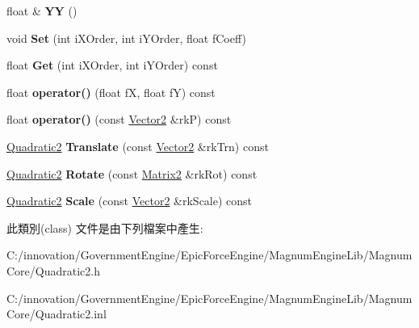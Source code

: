 \begin{DoxyCompactItemize}
\item 
float \& {\bfseries YY} ()\hypertarget{class_i_dream_sky_1_1_quadratic2_a40bb10511d8f31e854f7789db37356cf}{}\label{class_i_dream_sky_1_1_quadratic2_a40bb10511d8f31e854f7789db37356cf}

\item 
void {\bfseries Set} (int i\+X\+Order, int i\+Y\+Order, float f\+Coeff)\hypertarget{class_i_dream_sky_1_1_quadratic2_a2f5622be8b2299445e1d39a7514ee28c}{}\label{class_i_dream_sky_1_1_quadratic2_a2f5622be8b2299445e1d39a7514ee28c}

\item 
float {\bfseries Get} (int i\+X\+Order, int i\+Y\+Order) const \hypertarget{class_i_dream_sky_1_1_quadratic2_a476cbddad9dd4a3ae6b1df9775b54617}{}\label{class_i_dream_sky_1_1_quadratic2_a476cbddad9dd4a3ae6b1df9775b54617}

\item 
float {\bfseries operator()} (float fX, float fY) const \hypertarget{class_i_dream_sky_1_1_quadratic2_a0c7a97a7a261235abd651fbd392a0cfe}{}\label{class_i_dream_sky_1_1_quadratic2_a0c7a97a7a261235abd651fbd392a0cfe}

\item 
float {\bfseries operator()} (const \hyperlink{class_i_dream_sky_1_1_vector2}{Vector2} \&rkP) const \hypertarget{class_i_dream_sky_1_1_quadratic2_ae1313c0a1bc0eb271cf41f3d3d7e7712}{}\label{class_i_dream_sky_1_1_quadratic2_ae1313c0a1bc0eb271cf41f3d3d7e7712}

\item 
\hyperlink{class_i_dream_sky_1_1_quadratic2}{Quadratic2} {\bfseries Translate} (const \hyperlink{class_i_dream_sky_1_1_vector2}{Vector2} \&rk\+Trn) const \hypertarget{class_i_dream_sky_1_1_quadratic2_a974e3526894001b81a1eb7ef0a94c7c5}{}\label{class_i_dream_sky_1_1_quadratic2_a974e3526894001b81a1eb7ef0a94c7c5}

\item 
\hyperlink{class_i_dream_sky_1_1_quadratic2}{Quadratic2} {\bfseries Rotate} (const \hyperlink{class_i_dream_sky_1_1_matrix2}{Matrix2} \&rk\+Rot) const \hypertarget{class_i_dream_sky_1_1_quadratic2_a7a2b488eddd932248009b9cc1e5b778b}{}\label{class_i_dream_sky_1_1_quadratic2_a7a2b488eddd932248009b9cc1e5b778b}

\item 
\hyperlink{class_i_dream_sky_1_1_quadratic2}{Quadratic2} {\bfseries Scale} (const \hyperlink{class_i_dream_sky_1_1_vector2}{Vector2} \&rk\+Scale) const \hypertarget{class_i_dream_sky_1_1_quadratic2_abeeeb82edac8acb73fecf05974247b85}{}\label{class_i_dream_sky_1_1_quadratic2_abeeeb82edac8acb73fecf05974247b85}

\end{DoxyCompactItemize}


此類別(class) 文件是由下列檔案中產生\+:\begin{DoxyCompactItemize}
\item 
C\+:/innovation/\+Government\+Engine/\+Epic\+Force\+Engine/\+Magnum\+Engine\+Lib/\+Magnum\+Core/Quadratic2.\+h\item 
C\+:/innovation/\+Government\+Engine/\+Epic\+Force\+Engine/\+Magnum\+Engine\+Lib/\+Magnum\+Core/Quadratic2.\+inl\end{DoxyCompactItemize}
